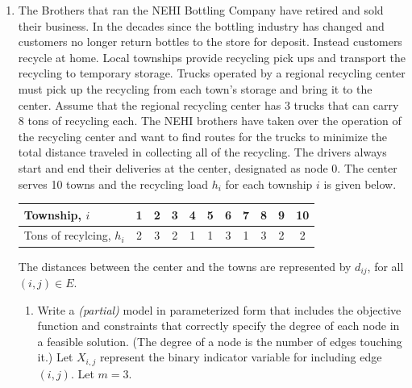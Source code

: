\documentclass[letterpaper,oneside,12pt]{article}%
\newcommand{\Sum}{\displaystyle \sum}
\begin{document}
\begin{enumerate}
\item The Brothers that ran the NEHI Bottling Company have retired and sold their business. In the decades since the bottling industry has changed and customers no longer return bottles to the store for deposit. Instead customers recycle at home. Local townships provide recycling pick ups and transport the recycling to temporary storage. Trucks operated by a regional recycling center must pick up the recycling from each town's storage and bring it to the center. Assume that the regional recycling center has 3 trucks that can carry 8 tons of recycling each. The NEHI brothers have taken over the operation of the recycling center and want to find routes for the trucks to minimize the total distance traveled in collecting all of the recycling. The drivers always start and end their deliveries at the center, designated as node 0.  The center serves 10 towns and the recycling load $h_i$ for each township $i$ is given below. 

\begin{center}
\begin{tabular}{|l||c|c|c|c|c|c|c|c|c|c|} \hline
Township, $i$
&  1	&	2	&	3	&	4	&     5	&	6	&	7	&	8	&   9    &     10
\\
\hline
Tons of recylcing, $h_i$ 
&   2	&	3	&	2	&	1	&	1	&	3	&	1	&	3	&    2   &   2 \\\hline
\end{tabular}
\end{center}

The distances between the center and the towns are represented by $d_{ij}$, for all $(i,j) \in E$.


\begin{enumerate}
\item Write a \emph{(partial)} model  in parameterized form that includes the objective function and constraints that correctly specify the degree of each node in a feasible solution.  (The degree of a node is the number of edges touching it.)   Let $X_{i,j}$ represent the binary indicator variable for including edge $(i,j)$.  Let $m=3$.


\end{enumerate}
\end{enumerate}
\end{document}
